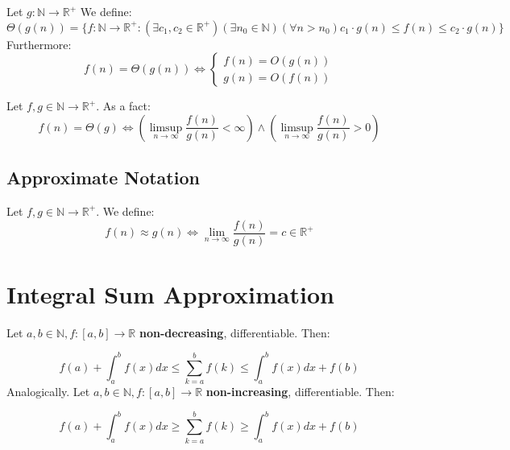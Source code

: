 \documentclass{article}
\newenvironment{definition}[1]{%
    \trivlist
    \item[\hskip\labelsep\textbf{Definition. #1.}]
    \ignorespaces
}{%
    \endtrivlist
}
\newenvironment{fact}[1]{%
    \trivlist
    \item[\hskip\labelsep\textbf{Fact. #1.}]
    \ignorespaces
}{%
    \endtrivlist
}
\newenvironment{theorem}[1]{%
    \trivlist
    \item[\hskip\labelsep\textbf{Theorem. #1.}]
    \ignorespaces
}{%
    \endtrivlist
}
\begin{document}
\begin{definition}{Big Theta Asymptotic Notation}
    Let $g: \mathbb{N}\rightarrow \mathbb{R}^{+}$ We define:
    \[\Theta\left(g(n)\right) = \{f:\mathbb{N}\rightarrow \mathbb{R}^{+} : \left(\exists c_1, c_2\in\mathbb{R}^{+}\right) \left(\exists n_0\in\mathbb{N}\right) \left(\forall n>n_0\right) c_1\cdot g(n) \leq f(n) \leq c_2\cdot g(n)\}\]
    Furthermore:
    \[f(n)=\Theta(g(n)) \iff 
    \begin{cases} 
        f(n) = O(g(n))\\
        g(n) = O(f(n))
    \end{cases}
    \]
\end{definition}

\begin{fact}{Big Theta Limit}
    Let $f,g \in\mathbb{N}\rightarrow\mathbb{R}^{+}$. As a fact:
    \[f(n)=\Theta(g) \iff \left(\limsup_{n\rightarrow\infty} \frac{f(n)}{g(n)} < \infty \right) \land \left(\limsup_{n\rightarrow\infty} \frac{f(n)}{g(n)} > 0 \right)\]
\end{fact}

\subsection{Approximate Notation}

\begin{definition}{$\approx$ Notation}
    Let $f,g \in\mathbb{N}\rightarrow\mathbb{R}^{+}$. We define:
    \[f(n) \approx g(n) \iff \lim_{n\rightarrow \infty} \frac{f(n)}{g(n)} = c \in \mathbb{R}^{+}\]
\end{definition}

\section{Integral Sum Approximation}

\begin{theorem}{Sum Approximation}
Let \(a,b \in \mathbb{N}, f:[a,b]\rightarrow\mathbb{R}\) \textbf{non-decreasing}, differentiable. Then:

\[
f(a) + \int_{a}^{b} f(x) dx \leq \sum_{k=a}^{b} f(k) \leq \int_{a}^{b} f(x) dx + f(b)
\]
Analogically. Let \(a,b \in \mathbb{N}, f:[a,b]\rightarrow\mathbb{R}\) \textbf{non-increasing}, differentiable. Then:

\[
f(a) + \int_{a}^{b} f(x) dx \geq \sum_{k=a}^{b} f(k) \geq \int_{a}^{b} f(x) dx + f(b)
\]  
\end{theorem}
\end{document}
